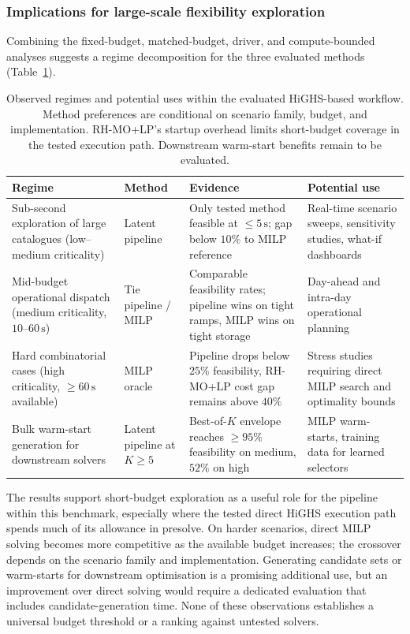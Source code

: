 \documentclass{article}
\begin{document}
\subsubsection{Implications for large-scale flexibility exploration}
\label{sec:regimes}

Combining the fixed-budget, matched-budget, driver, and compute-bounded analyses suggests a regime decomposition for the three evaluated methods (Table~\ref{tab:regimes}).

\begin{table}[htbp]
\centering
\small
\begin{tabular}{p{3cm}p{3.4cm}p{3.4cm}p{3.4cm}}
\toprule
Regime & Method & Evidence & Potential use \\
\midrule
Sub-second exploration of large catalogues (low--medium criticality) & Latent pipeline & Only tested method feasible at $\le 5\,\mathrm{s}$; gap below $10\%$ to MILP reference & Real-time scenario sweeps, sensitivity studies, what-if dashboards \\[2pt]
Mid-budget operational dispatch (medium criticality, $10$--$60\,\mathrm{s}$) & Tie pipeline / MILP & Comparable feasibility rates; pipeline wins on tight ramps, MILP wins on tight storage & Day-ahead and intra-day operational planning \\[2pt]
Hard combinatorial cases (high criticality, $\ge 60\,\mathrm{s}$ available) & MILP oracle & Pipeline drops below $25\%$ feasibility, RH-MO+LP cost gap remains above $40\%$ & Stress studies requiring direct MILP search and optimality bounds \\[2pt]
Bulk warm-start generation for downstream solvers & Latent pipeline at $K \ge 5$ & Best-of-$K$ envelope reaches $\ge 95\%$ feasibility on medium, $52\%$ on high & MILP warm-starts, training data for learned selectors \\
\bottomrule
\end{tabular}
\caption{Observed regimes and potential uses within the evaluated HiGHS-based workflow. Method preferences are conditional on scenario family, budget, and implementation. RH-MO+LP's startup overhead limits short-budget coverage in the tested execution path. Downstream warm-start benefits remain to be evaluated.}
\label{tab:regimes}
\end{table}

The results support short-budget exploration as a useful role for the pipeline within this benchmark, especially where the tested direct HiGHS execution path spends much of its allowance in presolve. On harder scenarios, direct MILP solving becomes more competitive as the available budget increases; the crossover depends on the scenario family and implementation. Generating candidate sets or warm-starts for downstream optimisation is a promising additional use, but an improvement over direct solving would require a dedicated evaluation that includes candidate-generation time. None of these observations establishes a universal budget threshold or a ranking against untested solvers.
\end{document}
